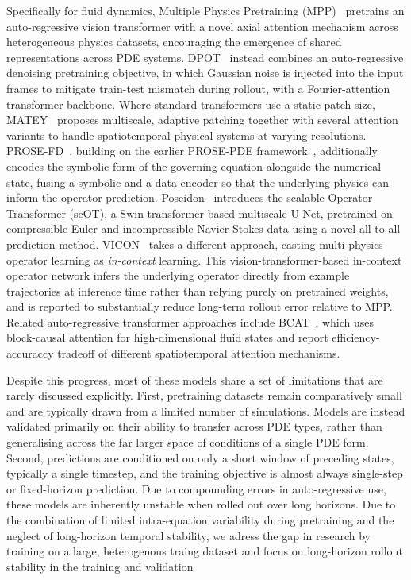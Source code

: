 Specifically for fluid dynamics, Multiple Physics Pretraining (MPP)~\cite{mccabe2024mpp} pretrains an auto-regressive vision transformer with a novel axial attention mechanism across heterogeneous physics datasets, encouraging the emergence of shared representations across PDE systems. DPOT~\cite{hao2024dpot} instead combines an auto-regressive denoising pretraining objective, in which Gaussian noise is injected into the input frames to mitigate train-test mismatch during rollout, with a Fourier-attention transformer backbone. Where standard transformers use a static patch size, MATEY~\cite{zhang2024matey} proposes multiscale, adaptive patching together with several attention variants to handle spatiotemporal physical systems at varying resolutions. PROSE-FD~\cite{liu2024prosefd}, building on the earlier PROSE-PDE framework~\cite{liu2024prosepde}, additionally encodes the symbolic form of the governing equation alongside the numerical state, fusing a symbolic and a data encoder so that the underlying physics can inform the operator prediction. Poseidon~\cite{herde2024poseidon} introduces the scalable Operator Transformer (scOT), a Swin transformer-based multiscale U-Net, pretrained on compressible Euler and incompressible Navier-Stokes data using a novel all to all prediction method. VICON~\cite{cao2024vicon} takes a different approach, casting multi-physics operator learning as \textit{in-context} learning. This vision-transformer-based in-context operator network infers the underlying operator directly from example trajectories at inference time rather than relying purely on pretrained weights, and is reported to substantially reduce long-term rollout error relative to MPP. Related auto-regressive transformer approaches include BCAT~\cite{liu2025bcat}, which uses block-causal attention for high-dimensional fluid states and report efficiency-accuraccy tradeoff of different spatiotemporal attention mechanisms.

Despite this progress, most of these models share a set of limitations that are rarely discussed explicitly. First, pretraining datasets remain comparatively small and are typically drawn from a limited number of simulations. Models are instead validated primarily on their ability to transfer across PDE types, rather than generalising across the far larger space of conditions of a single PDE form. Second, predictions are conditioned on only a short window of preceding states, typically a single timestep, and the training objective is almost always single-step or fixed-horizon prediction. Due to compounding errors in auto-regressive use, these models are inherently unstable when rolled out over long horizons. Due to the combination of limited intra-equation variability during pretraining and the neglect of long-horizon temporal stability, we adress the gap in research by training on a large, heterogenous traing dataset and focus on long-horizon rollout stability in the training and validation

